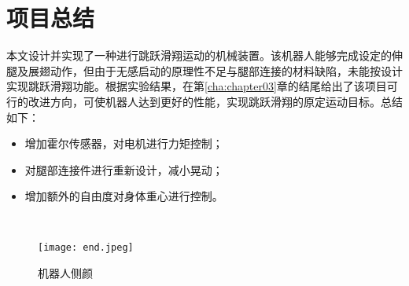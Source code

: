 
\chapter{项目总结}
\label{cha:chapter04}
本文设计并实现了一种进行跳跃滑翔运动的机械装置。该机器人能够完成设定的伸腿及展翅动作，但由于无感启动的原理性不足与腿部连接的材料缺陷，未能按设计实现跳跃滑翔功能。根据实验结果，在第\ref{cha:chapter03}章的结尾给出了该项目可行的改进方向，可使机器人达到更好的性能，实现跳跃滑翔的原定运动目标。总结如下：
\begin{itemize}
  \item 增加霍尔传感器，对电机进行力矩控制；
  \item 对腿部连接件进行重新设计，减小晃动；
  \item 增加额外的自由度对身体重心进行控制。
\end{itemize}

~\\
\begin{figure}[h]
  \centering%
  \texttt{[image: end.jpeg]}
  \caption{机器人侧颜}
  \label{fig:end}
\end{figure}